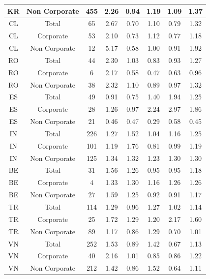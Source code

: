 {\begin{table}[ht]
{{\begin{tabular}{cccccccc}
                KR & Non Corporate & 455 & 2.26 & 0.94 & 1.19 & 1.09 & 1.37\\
                \midrule
                CL & Total & 65 & 2.67 & 0.70 & 1.10 & 0.79 & 1.32\\
                CL & Corporate & 53 & 2.10 & 0.73 & 1.12 & 0.77 & 1.18\\
                CL & Non Corporate & 12 & 5.17 & 0.58 & 1.00 & 0.91 & 1.92\\
                \midrule
                RO & Total & 44 & 2.30 & 1.03 & 0.83 & 0.93 & 1.27\\
                RO & Corporate & 6 & 2.17 & 0.58 & 0.47 & 0.63 & 0.96\\
                RO & Non Corporate & 38 & 2.32 & 1.10 & 0.89 & 0.97 & 1.32\\
                \midrule
                ES & Total & 49 & 0.91 & 0.75 & 1.40 & 1.94 & 1.25\\
                ES & Corporate & 28 & 1.26 & 0.97 & 2.24 & 2.97 & 1.86\\
                ES & Non Corporate & 21 & 0.46 & 0.47 & 0.29 & 0.58 & 0.45\\
                \midrule
                IN & Total & 226 & 1.27 & 1.52 & 1.04 & 1.16 & 1.25\\
                IN & Corporate & 101 & 1.19 & 1.76 & 0.81 & 0.99 & 1.19\\
                IN & Non Corporate & 125 & 1.34 & 1.32 & 1.23 & 1.30 & 1.30\\
                \midrule
                BE & Total & 31 & 1.56 & 1.26 & 0.95 & 0.95 & 1.18\\
                BE & Corporate & 4 & 1.33 & 1.30 & 1.16 & 1.26 & 1.26\\
                BE & Non Corporate & 27 & 1.59 & 1.25 & 0.92 & 0.91 & 1.17\\
                \midrule
                TR & Total & 114 & 1.29 & 0.96 & 1.27 & 1.02 & 1.14\\
                TR & Corporate & 25 & 1.72 & 1.29 & 1.20 & 2.17 & 1.60\\
                TR & Non Corporate & 89 & 1.17 & 0.86 & 1.29 & 0.70 & 1.01\\
                \midrule
                VN & Total & 252 & 1.53 & 0.89 & 1.42 & 0.67 & 1.13\\
                VN & Corporate & 40 & 2.16 & 1.01 & 0.85 & 0.86 & 1.22\\
                VN & Non Corporate & 212 & 1.42 & 0.86 & 1.52 & 0.64 & 1.11\\
                \bottomrule
            \end{tabular}}}
    \end{table}
}

